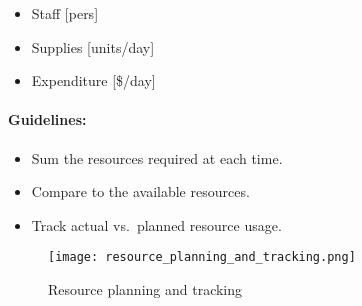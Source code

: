 \begin{itemize}
    \item Staff [pers]
    \item Supplies [units/day]
    \item Expenditure [\$/day]
\end{itemize}

\paragraph{Guidelines:}
\begin{itemize}
 \item Sum the resources required at each time.
 \item Compare to the available resources.
 \item Track actual vs.\ planned resource usage.
\end{itemize}

\begin{figure}[!ht]
    \centering
    \texttt{[image: resource\_planning\_and\_tracking.png]}
    \caption{Resource planning and tracking}
\end{figure}
\FloatBarrier{}
